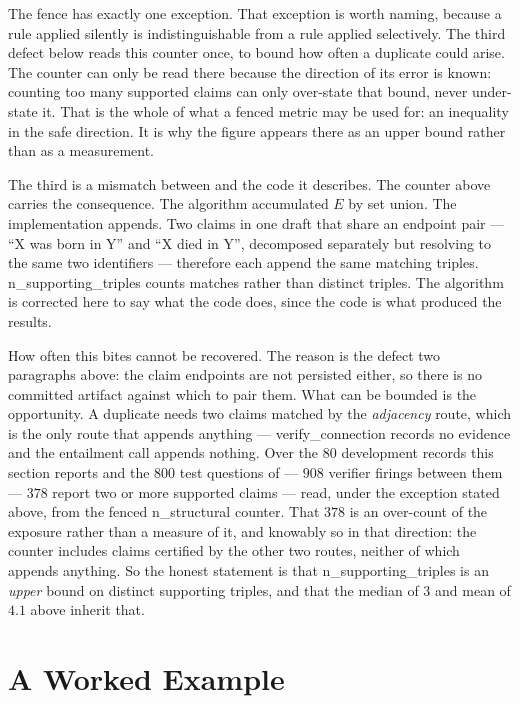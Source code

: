 The fence has exactly one exception. That exception is worth naming, because a
rule applied silently is indistinguishable from a rule applied selectively. The
third defect below reads this counter once, to bound how often a duplicate could
arise. The counter can only be read there because the direction of its error is
known: counting too many supported claims can only over-state that bound, never
under-state it. That is the whole of what a fenced metric may be used for: an
inequality in the safe direction. It is why the figure appears there as an upper
bound rather than as a measurement.

The third is a mismatch between  and the code it describes.
The counter above carries the consequence. The algorithm accumulated $E$ by
set union. The implementation appends. Two claims in one draft that share an
endpoint pair --- ``X was born in Y'' and ``X died in Y'', decomposed
separately but resolving to the same two identifiers --- therefore each append
the same matching triples. \textsf{n\_supporting\_triples} counts matches
rather than distinct triples. The algorithm is corrected here to say what the
code does, since the code is what produced the results.

How often this bites cannot be recovered. The reason is the defect two
paragraphs above: the claim endpoints are not persisted either, so there is no
committed artifact against which to pair them. What can be bounded is the
opportunity. A duplicate needs two claims matched by the \emph{adjacency} route,
which is the only route that appends anything --- \textsf{verify\_connection}
records no evidence and the entailment call appends nothing. Over the $80$
development records this section reports and the $800$ test questions of
 --- $908$ verifier firings between them --- $378$ report two
or more supported claims --- read, under the exception stated above, from the
fenced \textsf{n\_structural} counter. That $378$ is an over-count of the
exposure rather than a measure of it, and knowably so in that direction: the
counter includes claims certified by the other two routes, neither of which
appends anything. So the honest statement is that
\textsf{n\_supporting\_triples} is an \emph{upper} bound on distinct supporting
triples, and that the median of $3$ and mean of $4.1$ above inherit that.

\section{A Worked Example}\label{sec:verify-example}

